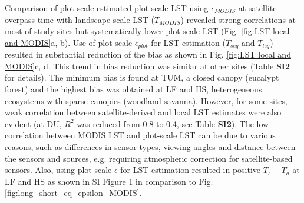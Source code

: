 \documentclass[fleqn,10pt]{wlscirep}
\begin{document}
Comparison of plot-scale estimated plot-scale LST using $\epsilon_{MODIS}$ at satellite overpass time with landscape scale LST ($T_{MODIS}$) revealed strong correlations at most of study sites but systematically lower plot-scale LST (Fig. \ref{fig:LST local and MODIS}a, b). Use  of plot-scale $\epsilon_{plot}$ for LST estimation ($T_{seq}$ and $T_{leq}$) resulted in substantial reduction of the bias as shown in Fig. \ref{fig:LST local and MODIS}c, d. This trend in bias reduction was similar at other sites (Table \textbf{SI2} for details). The  minimum bias is found  at TUM, a closed canopy (eucalypt forest) and the highest bias was obtained at LF and HS, heterogeneous ecosystems with sparse canopies (woodland savanna). However, for some sites, weak correlation between satellite-derived and local LST estimates were also evident (at DU, $R^2$ was reduced from 0.8 to 0.4, see Table \textbf{SI2}). The low correlation between MODIS LST and plot-scale LST can be due to various reasons, such as differences in sensor types, viewing angles and distance between the sensors and sources, e.g. requiring atmospheric correction for satellite-based sensors. Also, using plot-scale $\epsilon$ for LST estimation resulted in positive $T_{s} - T_{a}$ at LF and HS as shown in SI Figure 1 in comparison to Fig. \ref{fig:long_short_eq_epsilon_MODIS}.  
\end{document}
